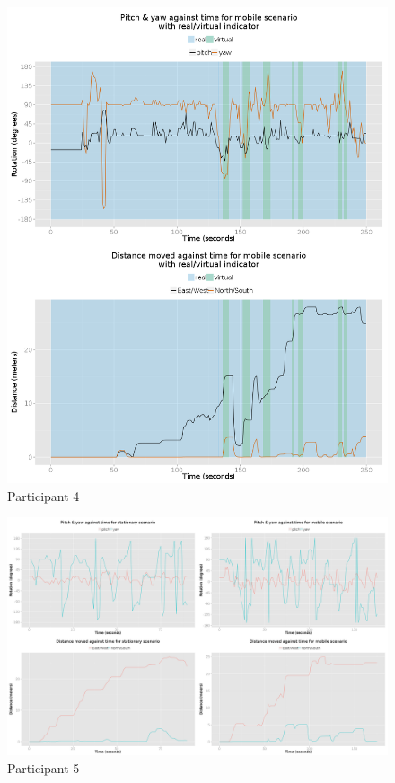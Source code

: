 \documentclass[oneside]{book}
\begin{document}
\begin{figure}[h]
	\begin{center}
		\includegraphics[width=\linewidth]{images/25072014_1500_2up.png}
		\caption{Participant 4}
		\label{participant_4_2up}
	\end{center}
\end{figure}


\begin{landscape}
	\begin{figure}[h]
		\begin{center}
			\includegraphics[width=\linewidth]{images/29082014_1350_4up.png}
			\caption{Participant 5}
			\label{participant_5_4up}
		\end{center}
	\end{figure}
\end{landscape}
\end{document}
